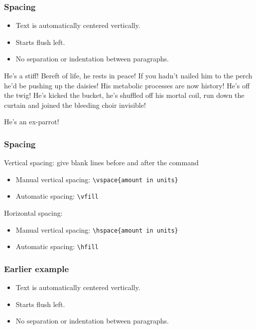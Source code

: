 \documentclass{beamer}
\begin{document}
\begin{frame}[fragile]\frametitle{Spacing}

\begin{itemize}
\item Text is automatically centered vertically.
\item Starts flush left.
\item No separation or indentation between paragraphs. %

\end{itemize}

He's a stiff! Bereft of life, he rests in peace! If you hadn't nailed him to the perch he'd be pushing up the daisies!
His metabolic processes are now history! He's off the twig!  He's kicked the bucket, he's shuffled off his mortal coil, run down the curtain and joined the bleeding choir invisible!

He's an ex-parrot!



\end{frame}

\begin{frame}[fragile]\frametitle{Spacing}

\vfill

Vertical spacing: give blank lines before and after the command %
\begin{itemize}
  \item Manual vertical spacing: \verb#\vspace{amount in units}#  %
  \item Automatic spacing: \verb#\vfill#
\end{itemize}

\vfill

Horizontal spacing: 
\begin{itemize}
  \item Manual vertical spacing: \verb#\hspace{amount in units}# 
  \item Automatic spacing: \verb#\hfill#
\end{itemize}

\vfill

\end{frame}

\begin{frame}\frametitle{Earlier example}

\begin{itemize}
\item Text is automatically centered vertically.
\item Starts flush left.
\item No separation or indentation between paragraphs. %
\end{itemize}



\end{frame}
\end{document}
